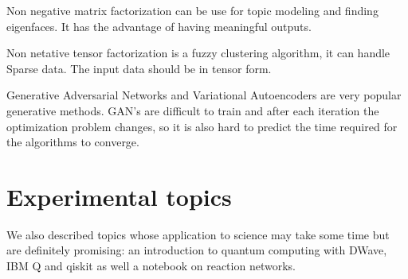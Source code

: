 \documentclass[11pt,letterpaper]{report}
\begin{document}
Non negative matrix factorization can be use for topic modeling and finding eigenfaces. It has the advantage of having meaningful outputs.

Non netative tensor factorization is a fuzzy clustering algorithm, it can handle  Sparse data\cite{ho}. The input data should be in tensor form.

Generative Adversarial Networks and Variational Autoencoders are very popular generative methods. GAN's are difficult to train and after each iteration the optimization problem changes, so it is also hard to predict the time required for the algorithms to converge. 


\section{Experimental topics}We also described topics whose application to science may take some time but are definitely promising: an introduction to quantum computing with DWave, IBM Q and qiskit as well a notebook on reaction networks.
	
	
	
	
	
	
\end{document}
